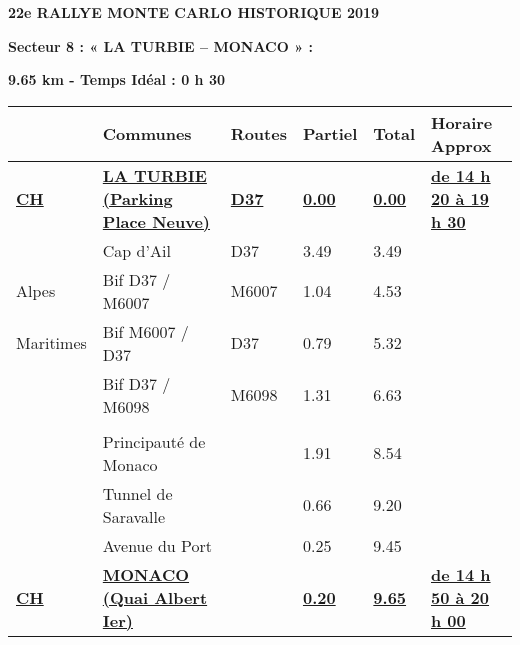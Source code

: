 \documentclass{article}%
\begin{document}
%
\normalsize%
\begin{center} \textbf{\LARGE{22e RALLYE MONTE CARLO HISTORIQUE 2019}} \end{center}%
\begin{flushleft} \textbf{Secteur 8 : « LA TURBIE – MONACO » :
} \end{flushleft}%
\begin{flushright}              \end{flushright}%
\begin{flushright} \textbf{9.65 km - Temps Idéal : 0 h 30} \end{flushright}%
\begin{longtable}{p{2.25cm}|p{6.7cm}|p{2.0cm}|p{1.5cm}|p{1.5cm}|p{3.5cm}}%
\hline%
&Communes&Routes&Partiel&Total&Horaire Approx\\%
\hline%
\endhead%
\endfoot%
\endlastfoot%
\textbf{\underline{﻿CH}}&\textbf{\underline{LA TURBIE (Parking Place Neuve)}}&\textbf{\underline{D37}}&\textbf{\underline{0.00}}&\textbf{\underline{0.00}}&\textbf{\underline{de 14 h 20 à 19 h 30}}\\%
 &Cap d’Ail&D37&3.49&3.49& \\%
Alpes&Bif D37 / M6007&M6007&1.04&4.53& \\%
Maritimes&Bif M6007 / D37&D37&0.79&5.32& \\%
 &Bif D37 / M6098&M6098&1.31&6.63& \\%
\hline& & & & & \\%
 &Principauté de Monaco& &1.91&8.54& \\%
 &Tunnel de Saravalle& &0.66&9.20& \\%
 &Avenue du Port& &0.25&9.45& \\%
\textbf{\underline{CH}}&\textbf{\underline{MONACO (Quai Albert Ier)}}& &\textbf{\underline{0.20}}&\textbf{\underline{9.65}}&\textbf{\underline{de 14 h 50 à 20 h 00}}\\%
\hline%
\end{longtable}%
\begin{flushleft} \textit{} \end{flushleft}%
\begin{center} \textit{\textbf{}} \end{center}%
\begin{center} \textit{} \end{center}%
\begin{center} \textit{} \end{center}%
\end{document}
